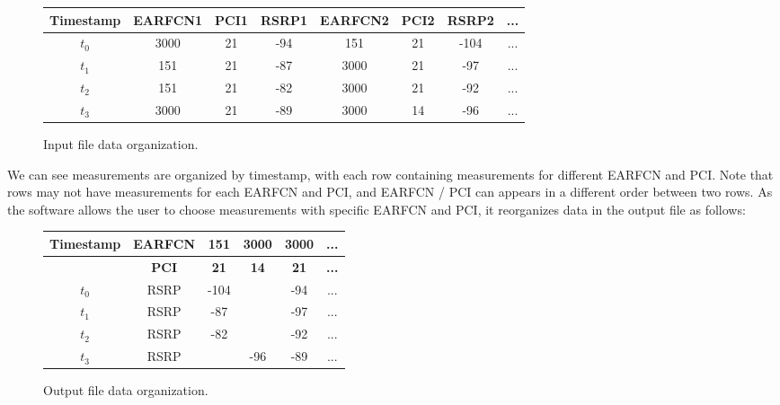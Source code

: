 \documentclass[a4paper, 11pt]{report}
\begin{document}
    \begin{figure}[H]
        \centering
        \begin{tabular}{|c|c|c|c|c|c|c|c|}
            \hline
            \textbf{Timestamp} & \textbf{EARFCN1} & \textbf{PCI1} & \textbf{RSRP1} & \textbf{EARFCN2} & \textbf{PCI2} & \textbf{RSRP2} & \textbf{...} \\
            \hline
            $t_0$ & 3000 & 21 & -94 & 151 & 21 & -104 & ... \\ \hline
            $t_1$ & 151 & 21 & -87 & 3000 & 21 & -97 & ... \\ \hline
            $t_2$ & 151 & 21 & -82 & 3000 & 21 & -92 & ... \\ \hline
            $t_3$ & 3000 & 21 & -89 & 3000 & 14 & -96 & ... \\ \hline
        \end{tabular}
        \caption{Input file data organization.}
        \label{Input file data organization.}
    \end{figure}
    
    We can see measurements are organized by timestamp, with each row containing measurements for different EARFCN and PCI. Note that rows may not have measurements for each EARFCN and PCI, and EARFCN / PCI can appears in a different order between two rows. As the software allows the user to choose measurements with specific EARFCN and PCI, it reorganizes data in the output file as follows:
    
    \begin{figure}[H]
        \centering
        \begin{tabular}{|c|c|c|c|c|c|}
            \hline
            \textbf{Timestamp} & \textbf{EARFCN} & \textbf{151} & \textbf{3000} & \textbf{3000} & \textbf{...} \\ \hline
            & \textbf{PCI} & \textbf{21} & \textbf{14} & \textbf{21} & \textbf{...} \\ \hline
            $t_0$ & RSRP & -104 & & -94 & ... \\ \hline
            $t_1$ & RSRP & -87 & & -97 & ... \\ \hline
            $t_2$ & RSRP & -82 & & -92 & ...\\ \hline
            $t_3$ & RSRP & & -96 & -89 & ... \\ \hline
        \end{tabular}
        \caption{Output file data organization.}
        \label{Input file data organization.}
    \end{figure}
    
\end{document}
